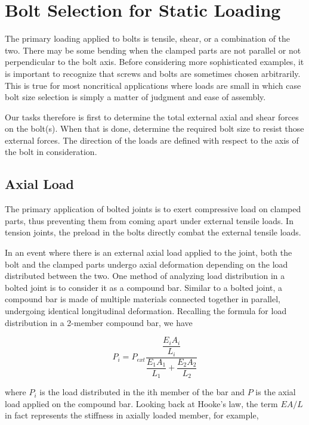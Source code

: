 \documentclass[
10pt,
a4paper,
openany,
svgnames,
]{book}
\begin{document}
\section{Bolt Selection for Static Loading} \label{sec: bolt for static loading}

The primary loading applied to bolts is tensile, shear, or a combination of the two. There may be some bending when the clamped parts are not parallel or not perpendicular to the bolt axis. Before considering more sophisticated examples, it is important to recognize that screws and bolts are sometimes chosen arbitrarily. This is true for most noncritical applications where loads are small in which case bolt size selection is simply a matter of judgment and ease of assembly.

Our tasks therefore is first to determine the total external axial and shear forces on the bolt(s). When that is done, determine the required bolt size to resist those external forces. The direction of the loads are defined with respect to the axis of the bolt in consideration. 

\subsection{Axial Load}

The primary application of bolted joints is to exert compressive load on clamped parts, thus preventing them from coming apart under external tensile loads. In tension joints, the preload in the bolts directly combat the external tensile loads.


In an event where there is an external axial load applied to the joint, both the bolt and the clamped parts undergo axial deformation depending on the load distributed between the two. One method of analyzing load distribution in a bolted joint is to consider it as a compound bar. Similar to a bolted joint, a compound bar is made of multiple materials connected together in parallel, undergoing identical longitudinal deformation. Recalling the formula for load distribution in a 2-member compound bar, we have

\begin{equation} \label{eqn: 2-member compound bar}
  P_i = P_{ext}\frac{\dfrac{E_iA_i}{L_i}}{\dfrac{E_1A_1}{L_1} + \dfrac{E_2A_2}{L_2}}
\end{equation}

where $P_i$ is the load distributed in the ith member of the bar and $P$ is the axial load applied on the compound bar. Looking back at Hooke’s law, the term $EA/L$ in fact represents the stiffness in axially loaded member, for example,
\end{document}
